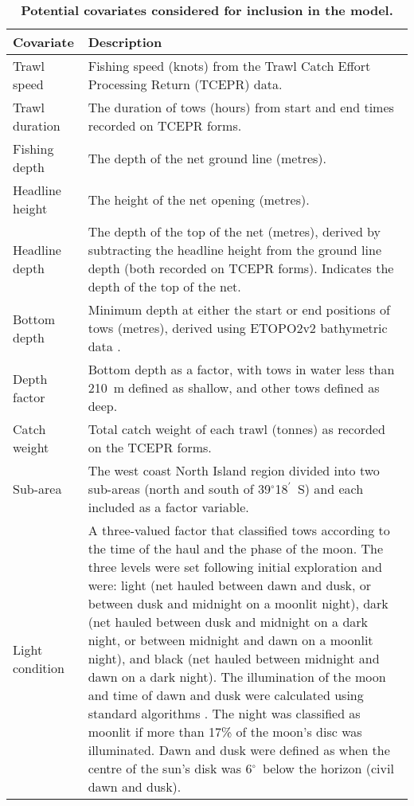 \documentclass[10pt]{article}
\newcommand{\degrees}{\ensuremath{^\circ}}
\newcommand{\minutes}{\ensuremath{^\prime}}
\begin{document}
\begin{table}[h]
\caption{\bf {Potential covariates considered for inclusion in the model.}} 
\begin{tabular}{|p{}|p{}|}
\hline
Covariate & Description\\ 
\hline
Trawl speed & Fishing speed (knots) from the  Trawl Catch
Effort Processing Return (TCEPR) data. \\ 
\hline
Trawl duration & The duration of tows (hours) from start and end times  recorded on TCEPR
forms. \\ 
\hline
Fishing depth & The depth of the net ground line (metres). \\ 
\hline
Headline height & The height of the net opening (metres). \\ 
\hline
Headline depth & The depth of the top of the net (metres), derived by
subtracting the headline height from the ground line depth (both recorded on TCEPR forms). Indicates the
depth of the top of the net.  \\ 
\hline
Bottom depth & Minimum depth at either the start
or end positions of tows (metres), derived using ETOPO2v2 bathymetric data
\cite{smith_global_1997, noaa_etopo2_2006}. \\ 
\hline
Depth factor  & Bottom depth as a factor, with tows
in water less than 210~m defined as shallow, and other tows defined as deep. \\ 
\hline
Catch weight & Total catch weight of each trawl (tonnes) as recorded
on the TCEPR forms.  \\ 
\hline
Sub-area &  The west coast North Island region divided
into two sub-areas (north and south of 39\degrees 18\minutes\ S) and
each included as a factor variable. \\ 
\hline
Light condition & A three-valued factor that classified tows according to the time of the haul
and the phase of the moon. The three levels were set following initial exploration and were: light  (net hauled between dawn and dusk, or between dusk and midnight on a
moonlit night), dark (net hauled between dusk and midnight on a dark night, or between
midnight and dawn on a moonlit night), and black (net hauled between
midnight and dawn on a dark night). The illumination of the moon and
time of dawn and dusk were calculated using standard algorithms
\cite{Meeus_astronomical_1991}. The night was
classified as moonlit if more than 17\% of the moon's disc was illuminated.  Dawn and dusk
were defined as when the centre of the sun's disk was 6\degrees\ below the horizon (civil dawn and dusk).\\ \hline

\end{tabular}
\end{table}
\end{document}
